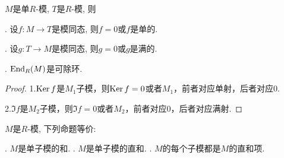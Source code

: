 \begin{proposition} \label{simple}
    $M$是单$R$-模, $T$是$R$-模, 则\par
    . 设$f:M\rightarrow T$是模同态, 则$f=0$或$f$是单的.\par
    . 设$g:T\rightarrow M$是模同态, 则$g=0$或$g$是满的.\par
    . $\operatorname{End}_R(M)$是可除环.
\end{proposition}
\begin{proof}
1.$\operatorname{Ker} f$是$M_1$子模，则$\operatorname{Ker} f={0}$或者$M_1$，前者对应单射，后者对应$0$.

2.$\Im f$是$M_2$子模，则$\Im f={0}$或者$M_2$，前者对应$0$，后者对应满射.
\end{proof}
\begin{proposition} $M$是$R$-模, 下列命题等价:\par
    . $M$是单子模的和.
    . $M$是单子模的直和.
    . $M$的每个子模都是$M$的直和项.
\end{proposition}
